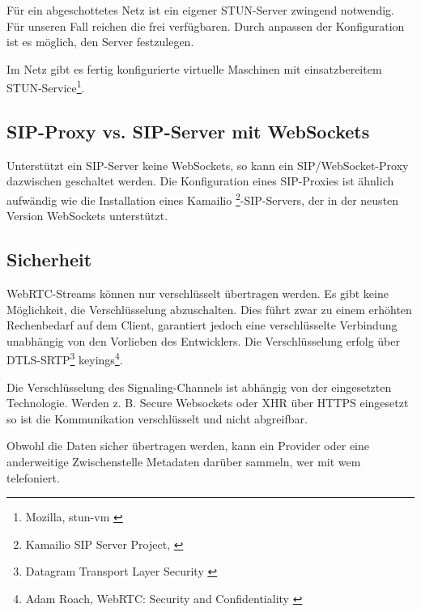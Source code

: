 		Für ein abgeschottetes Netz ist ein eigener STUN-Server zwingend notwendig.
		Für unseren Fall reichen die frei verfügbaren. Durch anpassen der
		Konfiguration ist es möglich, den Server festzulegen.

		Im Netz gibt es fertig konfigurierte virtuelle Maschinen mit einsatzbereitem
		STUN-Service\footnote{Mozilla, stun-vm \cite{Mozilla-STUN-VM}}.
		
			\subsection{SIP-Proxy vs. SIP-Server mit WebSockets}
		Unterstützt ein SIP-Server keine WebSockets, so kann ein SIP/WebSocket-Proxy
		dazwischen geschaltet werden. Die Konfiguration eines SIP-Proxies ist ähnlich
		aufwändig wie die Installation eines Kamailio
		\footnote{Kamailio SIP Server Project, \cite{Kamailio-Project}}-SIP-Servers, der in der neusten Version WebSockets unterstützt.

	\subsection{Sicherheit}
		WebRTC-Streams können nur verschlüsselt übertragen werden. Es gibt keine
		Möglichkeit, die Verschlüsselung abzuschalten. Dies führt zwar zu einem
		erhöhten Rechenbedarf auf dem Client, garantiert jedoch eine verschlüsselte
		Verbindung unabhängig von den Vorlieben des Entwicklers.
		Die Verschlüsselung erfolg über DTLS-SRTP\footnote{Datagram Transport Layer Security \cite{IETF-DTLS-RFC}} 
		keyings\footnote{Adam Roach, WebRTC: Security and Confidentiality \cite{AdamRoach-WebRTC-Security}}. 
		
		Die Verschlüsselung des Signaling-Channels ist abhängig von der eingesetzten
		Technologie. Werden z. B. Secure Websockets oder XHR über HTTPS eingesetzt so ist die Kommunikation verschlüsselt und nicht abgreifbar.
		
		Obwohl die Daten sicher übertragen werden, kann ein Provider oder eine anderweitige Zwischenstelle Metadaten darüber sammeln, wer mit wem telefoniert.
		
		